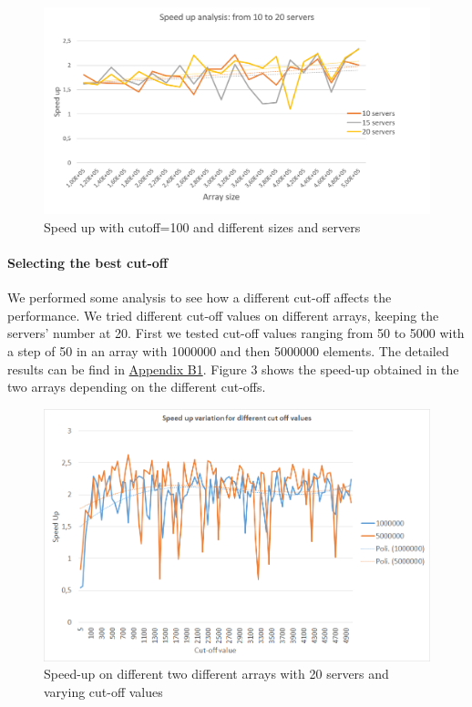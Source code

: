 \documentclass{article}
\begin{document}
	\begin{figure}[!h]
		\centering
		\includegraphics[width=0.8\linewidth]{imgs/SpeedUp10-20servers.png}
		\caption{Speed up with cutoff=100 and different sizes and servers}				
		\label{fig:SU02}
	\end{figure}

	\paragraph {Selecting the best cut-off}
	We performed some analysis to see how a different cut-off affects the performance. We tried different cut-off values on different arrays, keeping the servers' number at 20. First we tested cut-off values ranging from 50 to 5000 with a step of 50 in an array with 1000000 and then 5000000 elements. The detailed results can be find in \href{CO1}{Appendix B1}.
	Figure 3 shows the speed-up obtained in the two arrays depending on the different cut-offs.
	
	\begin{figure}[!h]
		\centering
		\includegraphics[width=0.8\linewidth]{imgs/SpeedUpForDifferentCutOff100-500mila.png}
		\caption{Speed-up on different two different arrays with 20 servers and varying cut-off values}				
		\label{fig:CO01}
	\end{figure}
	
\end{document}
